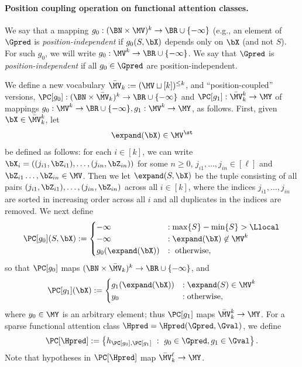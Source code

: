 \documentclass{article}
\begin{document}
\iftrue
\paragraph{Position coupling operation on functional attention classes.}
We say that a mapping $g_0 : (\BN \times \MV)^k \to \BR \cup \{-\infty\}$ (e.g., an element of $\Gpred$ is \emph{position-independent} if $g_0(S, \bX)$ depends only on $\bX$ (and not $S$). For such $g_0$, we will write $g_0 : \MV^k \to \BR \cup \{-\infty \}$. We say that $\Gpred$ is \emph{position-independent} if all $g_0 \in \Gpred$ are position-independent.


We define a new vocabulary $\bar \MV_k := (\MV \sqcup [k])^{\leq k}$, and ``position-coupled'' versions, $\PC[g_0] : (\BN \times \bar \MV_k)^k \to \BR \cup \{ -\infty\}$ and $\PC[g_1] : \bar \MV_k^k \to \MY$ of mappings $g_0 : \MV^k \to \BR \cup \{ -\infty \}, g_1 : \MV^k \to \MY$, as follows. First, given $\bX \in \bar\MV_k^k$, let
\begin{align}
\expand( \bX) \in \MV^\st\nonumber
\end{align}
be defined as follows: %
for each $i \in [k]$, we can write $\bX_{i} = ( (j_{i1}, \bZ_{i1}), \ldots, (j_{in}, \bZ_{in}))$ for some $n \geq 0$, $j_{i1}, \ldots, j_{in} \in [\ell]$ and  $ \bZ_{i1} \ldots, \bZ_{in} \in \MV$. Then we let $\expand(S, \bX)$ be the tuple consisting of all pairs $(j_{i1}, \bZ_{i1}), \ldots, (j_{in}, \bZ_{in})$ across all $i \in [k]$, where the indices $j_{i1}, \ldots, j_{in}$ are sorted in increasing order across all $i$ and all duplicates in the indices are removed. %
We next define
\begin{align}
  \PC[g_0](S, \bX) := \begin{cases}
    -\infty &: \max\{ S \} - \min\{S \} > \Llocal \\
    -\infty &: \expand(\bX) \not \in \MV^k \\
    g_0(\expand(\bX)) &: \mbox{ otherwise},
    \end{cases} \label{eq:define-pc-g0}
\end{align}
so that $\PC[g_0]$ maps $(\BN \times \bar\MV_k)^k \to \BR \cup \{-\infty \}$, and
\begin{align}
  \PC[g_1](\bX) := \begin{cases}
    g_1(\expand(\bX)) &: \expand(S) \in \MV^k \\
    y_0 &: \mbox{otherwise},
  \end{cases}\label{eq:define-pc-g1}
\end{align}
where $y_0 \in \MY$ is an arbitrary element; thus $\PC[g_1]$ maps $\bar\MV_k^k \to \MY$. 
For a sparse functional attention class $\Hpred = \Hpred(\Gpred, \Gval)$, we define
\begin{align}
\PC[\Hpred] := \left\{ h_{\PC[g_0], \PC[g_1]} \ : \ g_0 \in \Gpred, g_1 \in \Gval \right\}\nonumber.
\end{align}
Note that hypotheses in $\PC[\Hpred]$ map $\bar\MV_k^\ell \to \MY$. 
\fi 
\end{document}

